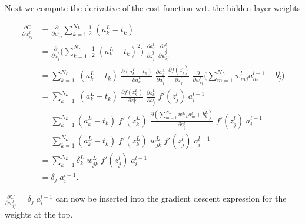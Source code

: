 \documentclass[a4paper, 12pt]{article}
\begin{document}
Next we compute the derivative of the cost function wrt. the hidden layer weights

\begin{align*}
\frac{\partial C}{\partial w_{ij}^l} &= \frac{\partial}{\partial w_{ij}^l} \sum_{k=1}^{N_L} \frac{1}{2} \;(a_k^L - t_k)\\
&= \frac{\partial}{\partial a_j^l}\Big( \sum_{k=1}^{N_L}\; \frac{1}{2}\; (a_k^L - t_k)^2 \Big) \;\frac{\partial a_j^l}{\partial z_j^l} \; \frac{\partial z_j^l}{\partial w_{ij}^l}\\
&= \sum_{k=1}^{N_L} \;(a_k^L - t_k) \; \frac{\partial (a_k^L - t_k)}{\partial a_k^L} \; \frac{\partial a_k^L}{\partial a_j^l}\; \frac{\partial f(z_j^l)}{\partial z_j^l} \; \frac{\partial}{\partial w_{ij}^l} \Big(\sum_{m=1}^{N_L} w_{mj}^l a_m^{l-1} + b_j^l\Big)\\
&= \sum_{k=1}^{N_L} \;(a_k^L - t_k)\; \frac{\partial f(z_k^L)}{\partial z_k^L}\; \frac{\partial z_k^L}{\partial a_j^l}\; f'(z_j^l)\; a_i^{l-1}\\
&= \sum_{k=1}^{N_L} (a_k^L - t_k)\; f'(z_k^L)\; \frac{\partial (\sum_{m=1}^{N_L} w_{mk}^L a_m^l + b_k^L)}{\partial a_j^l}\; f'(z_j^l)\; a_i^{l-1}\\
&= \sum_{k=1}^{N_L} (a_k^L - t_k)\; f'(z_k^L)\;w_{jk}^L\; f'(z_j^l)\; a_i^{l-1}\\
&= \sum_{k=1}^{N_L} \delta_k^L \;w_{jk}^L\; f'(z_j^l)\; a_i^{l-1}\\
&= \delta_j\; a_i^{l-1}.
\end{align*}

$\frac{\partial C}{\partial w_{ij}^l} = \delta_j\; a_i^{l-1}$ can now be inserted into the gradient descent expression for the weights at the top.
\end{document}

